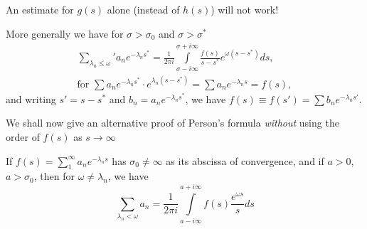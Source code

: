 \medskip
{}
An estimate  for $g(s)$ alone (instead of $h(s)$) will not work!

\begin{remarks*}
More generally we have for $\sigma > \sigma_0$ and $\sigma >
\sigma^\ast$
\begin{gather*}
{\mathop{\sum\limits}_{\lambda_n \leq \omega}}' a_n e^{-\lambda_n s^\ast}  =
\frac{1}{2\pi i} \int\limits^{\sigma + i
  \infty}_{\sigma - i \infty} \frac{f(s)}{s-s^\ast} e^{\omega
  (s-s^\ast)}ds,\\
\text{for } \sum a_n e^{-\lambda_n s^\ast} \cdot e^{\lambda_n(s-s^\ast)} =
\sum a_n  e^{-\lambda_n s} = f(s), 
\end{gather*}
and writing $s'=s-s^\ast$ and $b_n = a_n e^{-\lambda_ns^\ast}$, we
have $f(s) \equiv f(s') = \sum b_n e^{-\lambda_ns'}$.

We shall now give an alternative proof of Person's formula
\textit{without} using the order of $f(s)$ as $s \to \infty$
\cite[Lec. \ref{chap4}]{key14} 
\end{remarks*}

\medskip
{}
If $f(s) = \sum\limits^\infty_1 a_n e^{-\lambda_ns}$ has $\sigma_0
\neq \infty$ as its abscissa of convergence, and if $a>0$,
$a>\sigma_0$, then for $\omega \neq \lambda_n$, we have
$$
\sum\limits_{\lambda_n < \omega} a_n = \frac{1}{2\pi i}
\int\limits^{a+i\infty}_{a-i\infty} f(s) \frac{e^{\omega s}}{s} ds
$$

